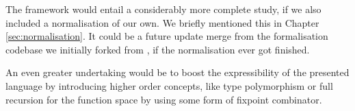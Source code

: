 The framework would entail a considerably more complete study, if we also included a normalisation of our own. We briefly mentioned this in Chapter \ref{sec:normalisation}. It could be a future update merge from the formalisation codebase we initially forked from \cite{typesystems-repo}, if the normalisation ever got finished.

An even greater undertaking would be to boost the expressibility of the presented language by introducing higher order concepts, like type polymorphism or full recursion for the function space by using some form of fixpoint combinator.

